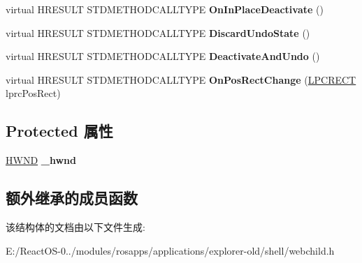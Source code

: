 \begin{DoxyCompactItemize}
\item 
\mbox{\label{struct_ole_in_place_client_a56bbd1e37fd58c62e648fd2621ee029e}} 
virtual H\+R\+E\+S\+U\+LT S\+T\+D\+M\+E\+T\+H\+O\+D\+C\+A\+L\+L\+T\+Y\+PE {\bfseries On\+In\+Place\+Deactivate} ()
\item 
\mbox{\label{struct_ole_in_place_client_ae7622f3ba972f3ce801a133f1888943d}} 
virtual H\+R\+E\+S\+U\+LT S\+T\+D\+M\+E\+T\+H\+O\+D\+C\+A\+L\+L\+T\+Y\+PE {\bfseries Discard\+Undo\+State} ()
\item 
\mbox{\label{struct_ole_in_place_client_a428e2e12025f5f9c6df86fc766bcc9bf}} 
virtual H\+R\+E\+S\+U\+LT S\+T\+D\+M\+E\+T\+H\+O\+D\+C\+A\+L\+L\+T\+Y\+PE {\bfseries Deactivate\+And\+Undo} ()
\item 
\mbox{\label{struct_ole_in_place_client_acd5176f109c865d17acaae2c33b83b3b}} 
virtual H\+R\+E\+S\+U\+LT S\+T\+D\+M\+E\+T\+H\+O\+D\+C\+A\+L\+L\+T\+Y\+PE {\bfseries On\+Pos\+Rect\+Change} (\hyperlink{structtag_r_e_c_t}{L\+P\+C\+R\+E\+CT} lprc\+Pos\+Rect)
\end{DoxyCompactItemize}
\subsection*{Protected 属性}
\begin{DoxyCompactItemize}
\item 
\mbox{\label{struct_ole_in_place_client_a8f34acf7105550a2efae1835e369632e}} 
\hyperlink{interfacevoid}{H\+W\+ND} {\bfseries \+\_\+hwnd}
\end{DoxyCompactItemize}
\subsection*{额外继承的成员函数}


该结构体的文档由以下文件生成\+:\begin{DoxyCompactItemize}
\item 
E\+:/\+React\+O\+S-\/0../modules/rosapps/applications/explorer-\/old/shell/webchild.\+h\end{DoxyCompactItemize}
